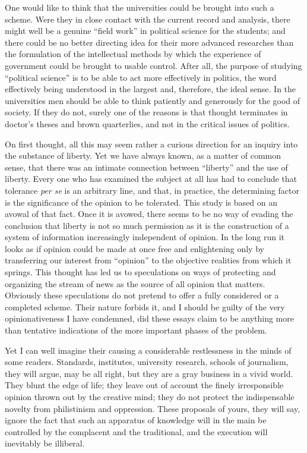 \documentclass[openany,nobib,nohyper]{tufte-book}
\begin{document}
One would like to think that the universities could be brought into such
a scheme. Were they in close contact with the current record and
analysis, there might well be a genuine ``field work'' in political
science for the students; and there could be no better directing idea
for their more advanced researches than the formulation of the
intellectual methods by which the experience of government could be
brought to usable control. After all, the purpose of studying
``political science'' is to be able to act more effectively in politics,
the word effectively being understood in the largest and, therefore, the
ideal sense. In the universities men should be able to think patiently
and generously for the good of society. If they do not, surely one of
the reasons is that thought terminates in doctor's theses and brown
quarterlies, and not in the critical issues of politics.

On first thought, all this may seem rather a curious direction for an
inquiry into the substance of liberty. Yet we have always known, as a
matter of common sense, that there was an intimate connection between
``liberty'' and the use of liberty. Every one who has examined the
subject at all has had to conclude that tolerance \emph{per se} is an
arbitrary line, and that, in practice, the determining factor is the
significance of the opinion to be tolerated. This study is based on an
avowal of that fact. Once it is avowed, there seems to be no way of
evading the conclusion that liberty is not so much permission as it is
the construction of a system of information increasingly independent of
opinion. In the long run it looks as if opinion could be made at once
free and enlightening only by transferring our interest from ``opinion''
to the objective realities from which it springs. This thought has led
us to speculations on ways of protecting and organizing the stream of
news as the source of all opinion that matters. Obviously these
speculations do not pretend to offer a fully considered or a completed
scheme. Their nature forbids it, and I should be guilty of the very
opinionativeness I have condemned, did these essays claim to be anything
more than tentative indications of the more important phases of the
problem.

Yet I can well imagine their causing a considerable restlessness in the
minds of some readers. Standards, institutes, university research,
schools of journalism, they will argue, may be all right, but they are a
gray business in a vivid world. They blunt the edge of life; they leave
out of account the finely irresponsible opinion thrown out by the
creative mind; they do not protect the indispensable novelty from
philistinism and oppression. These proposals of yours, they will say,
ignore the fact that such an apparatus of knowledge will in the main be
controlled by the complacent and the traditional, and the execution will
inevitably be illiberal.
\end{document}

